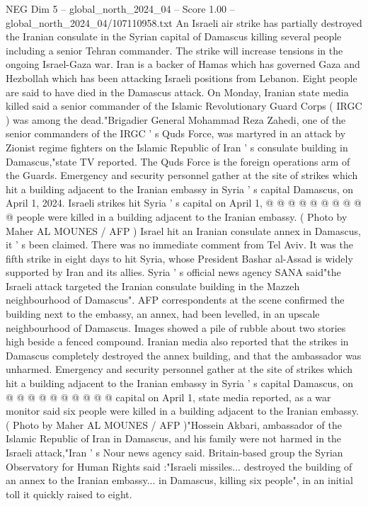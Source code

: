 \begin{textsample}{NEG Dim 5 – global\_north\_2024\_04 – Score 1.00 – global\_north\_2024\_04/107110958.txt}  \label{ex:f5_neg_169}
An Israeli air strike has partially destroyed the Iranian consulate in the Syrian capital of Damascus killing several people including a senior Tehran commander.
The strike will increase tensions in the ongoing Israel-Gaza war.
Iran is a backer of Hamas which has governed Gaza and Hezbollah which has been attacking Israeli positions from Lebanon.
Eight people are said to have died in the Damascus attack.
On Monday, Iranian state media killed said a senior commander of the Islamic Revolutionary Guard Corps ( IRGC ) was among the dead."Brigadier General Mohammad Reza Zahedi, one of the senior commanders of the IRGC ' s Quds Force, was martyred in an attack by Zionist regime fighters on the Islamic Republic of Iran ' s consulate building in Damascus,"state TV reported.
The Quds Force is the foreign operations arm of the Guards.
Emergency and security personnel gather at the site of strikes which hit a building adjacent to the Iranian embassy in Syria ' s capital Damascus, on April 1, 2024.
Israeli strikes hit Syria ' s capital on April 1, @ @ @ @ @ @ @ @ @ @ people were killed in a building adjacent to the Iranian embassy. ( Photo by Maher AL MOUNES / AFP ) Israel hit an Iranian consulate annex in Damascus, it ' s been claimed.
There was no immediate comment from Tel Aviv.
It was the fifth strike in eight days to hit Syria, whose President Bashar al-Assad is widely supported by Iran and its allies.
Syria ' s official news agency SANA said"the Israeli attack targeted the Iranian consulate building in the Mazzeh neighbourhood of Damascus".
AFP correspondents at the scene confirmed the building next to the embassy, an annex, had been levelled, in an upscale neighbourhood of Damascus.
Images showed a pile of rubble about two stories high beside a fenced compound.
Iranian media also reported that the strikes in Damascus completely destroyed the annex building, and that the ambassador was unharmed.
Emergency and security personnel gather at the site of strikes which hit a building adjacent to the Iranian embassy in Syria ' s capital Damascus, on @ @ @ @ @ @ @ @ @ @ capital on April 1, state media reported, as a war monitor said six people were killed in a building adjacent to the Iranian embassy. ( Photo by Maher AL MOUNES / AFP )"Hossein Akbari, ambassador of the Islamic Republic of Iran in Damascus, and his family were not harmed in the Israeli attack,"Iran ' s Nour news agency said.
Britain-based group the Syrian Observatory for Human Rights said :"Israeli missiles... destroyed the building of an annex to the Iranian embassy... in Damascus, killing six people", in an initial toll it quickly raised to eight.

\end{textsample}
